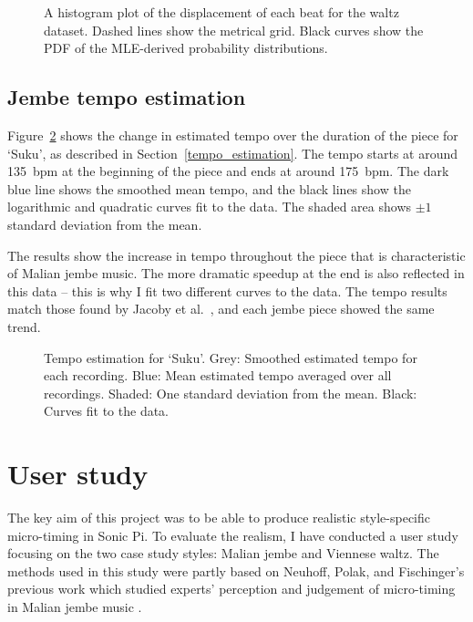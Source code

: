 \documentclass[12pt,twoside,openright]{report}
\begin{document}
\begin{figure}[ht]
    \centering
    
    \caption{A histogram plot of the displacement of each beat for the waltz dataset. Dashed lines show the metrical grid. Black curves show the PDF of the MLE-derived probability distributions.}
    \label{fig:waltz_histogram}
\end{figure}


\subsection{Jembe tempo estimation} \label{jembe_tempo_estimation_results}

Figure~\ref{fig:suku_tempo} shows the change in estimated tempo over the duration of the piece for
`Suku', as described in Section~\ref{tempo_estimation}. The tempo starts at around 135~bpm at the beginning of the piece and
ends at around 175~bpm. The dark blue line shows the smoothed mean tempo, and
the black lines show the logarithmic and quadratic curves fit to the data. The
shaded area shows $\pm1$ standard deviation from the mean.

The results show the increase in tempo throughout the piece that is characteristic of Malian jembe music. The more dramatic speedup at the end is also reflected in this data -- this is why I fit two different curves to the data. The tempo results match those found by Jacoby et al.\ \cite{jacoby2021supp}, and each jembe piece showed the same trend.

\begin{figure}[ht]
    \centering
    
    \caption{Tempo estimation for `Suku'. Grey: Smoothed estimated tempo for each recording. Blue: Mean estimated tempo averaged over all recordings. Shaded: One standard deviation from the mean. Black: Curves fit to the data.}
    \label{fig:suku_tempo}
\end{figure}



\section{User study} \label{user_study}

The key aim of this project was to be able to produce realistic style-specific
micro-timing in Sonic Pi. To evaluate the realism, I have conducted a user study
focusing on the two case study styles: Malian jembe and Viennese waltz. The
methods used in this study were partly based on Neuhoff, Polak, and Fischinger's
previous work which studied experts' perception and judgement of
micro-timing in Malian jembe music \cite{neuhoff2017}.
\end{document}
